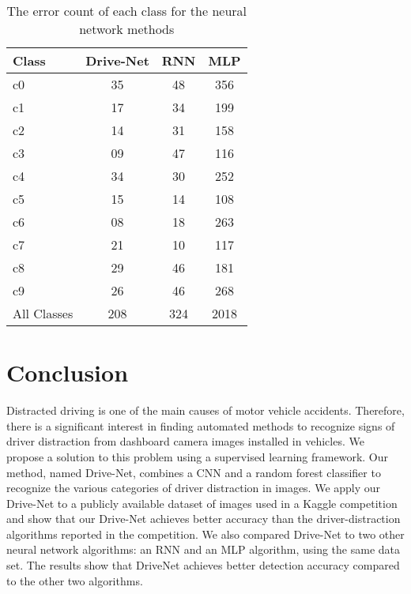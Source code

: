 \begin{table}[]
\centering
\caption{The error count of each class for the neural network methods}%
\label{Drive-Net.Table.2}
\begin{tabular}{@{}lccc@{}}
\toprule
\rowcolor[HTML]{FFFFFF}
Class       & Drive-Net & RNN & MLP  \\ \midrule
c0          & 35        & 48  & 356  \\
c1          & 17        & 34  & 199  \\
c2          & 14        & 31  & 158  \\
c3          & 09        & 47  & 116  \\
c4          & 34        & 30  & 252  \\
c5          & 15        & 14  & 108  \\
c6          & 08        & 18  & 263  \\
c7          & 21        & 10  & 117  \\
c8          & 29        & 46  & 181  \\
c9          & 26        & 46  & 268  \\
\rowcolor[HTML]{EFEFEF}
All Classes & 208       & 324 & 2018 \\ \bottomrule
\end{tabular}
\end{table}

\section{Conclusion}
Distracted driving is one of the main causes of motor vehicle accidents. Therefore, there is a significant interest in finding automated methods to recognize signs of driver distraction from dashboard camera images installed in vehicles. We propose a solution to this problem using a supervised learning framework. Our method, named Drive-Net, combines a CNN and a random forest classifier to recognize the various categories of driver distraction in images. We apply our Drive-Net to a publicly available dataset of images used in a Kaggle competition and show that our Drive-Net achieves better accuracy than the driver-distraction algorithms reported in the competition. We also compared Drive-Net to two other neural network algorithms: an RNN and an MLP algorithm, using the same data set. The results show that DriveNet achieves better detection accuracy compared to the other two algorithms.
